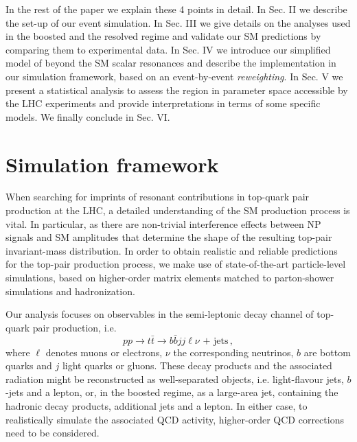 \documentclass[aps,prd,amsmath,amssymb,superscriptaddress, preprintnumbers,preprint,nofootinbib,a4paper]{revtex4}
\newcommand{\ttb}{t\bar{t}}
\begin{document}
In the rest of the paper we explain these 4 points in detail.
In Sec. II we describe the set-up of our event simulation. In Sec. III
we give details on the analyses used in the boosted and the resolved regime and validate our SM predictions
by comparing them to experimental data. In Sec. IV we introduce our simplified model of beyond the SM scalar
resonances and describe the implementation in our simulation framework, based on an event-by-event \emph{reweighting}.
In Sec. V we present a statistical analysis to assess the region in parameter space accessible by the LHC 
experiments and provide interpretations in terms of some specific models. We finally conclude in Sec. VI.

\section{Simulation framework}
\label{sec:simulation}

When searching for imprints of resonant contributions in top-quark pair production at the LHC, a detailed
understanding of the SM production process is vital. In particular, as there are non-trivial interference
effects between NP signals and SM amplitudes that determine the shape of the resulting top-pair invariant-mass
distribution. In order to obtain realistic and reliable predictions for the top-pair production process,
we make use of state-of-the-art particle-level simulations, based on higher-order matrix elements matched
to parton-shower simulations and hadronization. 

Our analysis focuses on observables in the semi-leptonic decay channel of top-quark pair production, i.e.
%
\begin{equation}
pp\to \ttb \to b\bar{b}jj\ell\nu\text{ + jets}\,,
\label{eq:process}
\end{equation}
%
where $\ell$ denotes muons or electrons, $\nu$ the corresponding neutrinos, $b$ are bottom quarks and $j$
light quarks or gluons. These decay products and the associated radiation might be reconstructed as
well-separated objects, i.e. light-flavour jets, $b$-jets and a lepton, or, in the boosted regime, as a large-area jet,
containing the hadronic decay products, additional jets and a lepton. In either case, to realistically simulate
the associated QCD activity, higher-order QCD corrections need to be considered. 
\end{document}
